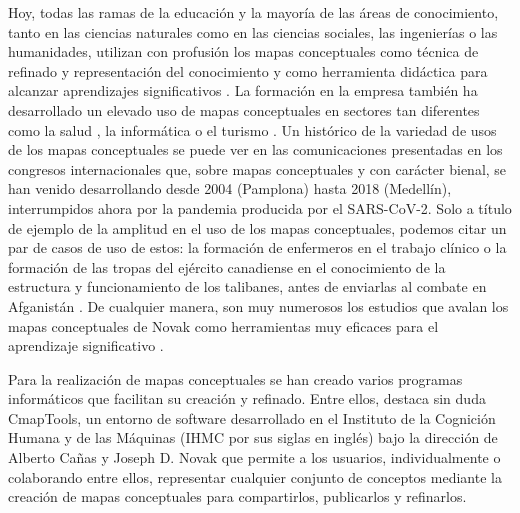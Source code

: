 \documentclass[spanish]{textolivre}
\begin{document}
Hoy, todas las ramas de la educación y la mayoría de las áreas de conocimiento, tanto en las ciencias naturales como en las ciencias sociales, las ingenierías o las humanidades, utilizan con profusión los mapas conceptuales como técnica de refinado y representación del conocimiento y como herramienta didáctica para alcanzar aprendizajes significativos \cite{ausubel_educational_1968}. %
La formación en la empresa también ha desarrollado un elevado uso de mapas conceptuales \cite{gaines1996knowledge,michalski2000differences} %
en sectores tan diferentes como la salud \cite{dopp_integrating_2019}, %
la informática \cite{anwar_systematic_2019} %
o el turismo \cite{enrique_bigne_concept_2002}. %
Un histórico de la variedad de usos de los mapas conceptuales se puede ver en las comunicaciones presentadas en los congresos internacionales que, sobre mapas conceptuales y con carácter bienal, se han venido desarrollando desde 2004 (Pamplona) hasta 2018 (Medellín), interrumpidos ahora por la pandemia producida por el SARS-CoV-2. Solo a título de ejemplo de la amplitud en el uso de los mapas conceptuales, podemos citar un par de casos de uso de estos: la formación de enfermeros en el trabajo clínico \cite{jamison2014engaging} %
o la formación de las tropas del ejército canadiense en el conocimiento de la estructura y funcionamiento de los talibanes, antes de enviarlas al combate en Afganistán \cite{moore2012}. %
De cualquier manera, son muy numerosos los estudios que avalan los mapas conceptuales de Novak como herramientas muy eficaces para el aprendizaje significativo \cite{agra_analysis_2019,marco_mapas_2018,dominguez_efectos_2020,schroeder2018studying}. %

Para la realización de mapas conceptuales se han creado varios programas informáticos que facilitan su creación y refinado. Entre ellos, destaca sin duda CmapTools, un entorno de software desarrollado en el Instituto de la Cognición Humana y de las Máquinas (IHMC por sus siglas en inglés) bajo la dirección de Alberto Cañas y Joseph D. Novak \cite{canas2018ecmap} %
que permite a los usuarios, individualmente o colaborando entre ellos, representar cualquier conjunto de conceptos mediante la creación de mapas conceptuales para compartirlos, publicarlos y refinarlos.
\end{document}
